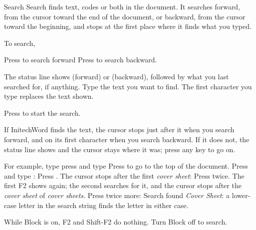 \begin{Feature}{Search}
Search finds text, codes or both in the document.  It searches forward,
from the cursor toward the end of the document, or backward, from the
cursor toward the beginning, and stops at the first place where it finds
what you typed.

To search,
\begin{WPSteps}
\item Press  to search forward
\Or
Press  to search backward.
\item The status line shows  (forward) or 
(backward), followed by what you last searched for, if anything.  Type the
text you want to find.  The first character you type replaces the text
shown.
\item Press  to start the search.
\end{WPSteps}
If InitechWord finds the text, the cursor stops just after it when you
search forward, and on its first character when you search backward.  If it
does not, the status line shows  and the cursor stays
where it was; press any key to go on.

For example, type
press  and type
Press  to go to the top of the document.  Press
 and type :
Press .  The cursor stops after the first \textit{cover sheet}:
Press  twice.  The first F2 shows 
again; the second searches for it, and the cursor stops after the
\textit{cover sheet} of \textit{cover sheets}.  Press  twice
more:
Search found \textit{Cover Sheet}: a lower-case letter in the search string
finds the letter in either case.
\EndReplay

\Notes
{}
While Block is on, F2 and Shift-F2 do nothing.  Turn Block off to search.


\end{Feature}
